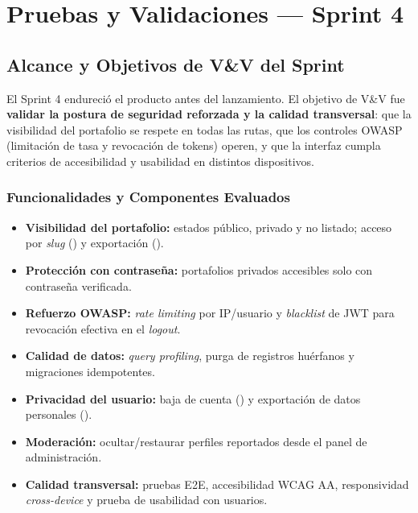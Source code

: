 \chapter{Pruebas y Validaciones — Sprint 4}
\label{ch:sprint4}

\section{Alcance y Objetivos de V\&V del Sprint}
\label{sec:s4-alcance}

El Sprint 4 endureció el producto antes del lanzamiento. El objetivo de V\&V fue
\textbf{validar la postura de seguridad reforzada y la calidad transversal}: que la
visibilidad del portafolio se respete en todas las rutas, que los controles OWASP
(limitación de tasa y revocación de tokens) operen, y que la interfaz cumpla criterios de
accesibilidad y usabilidad en distintos dispositivos.

\subsection{Funcionalidades y Componentes Evaluados}
\label{sec:s4-funcionalidades}

\begin{itemize}
    \item \textbf{Visibilidad del portafolio:} estados público, privado y no listado;
    acceso por \textit{slug} () y exportación
    ().
    \item \textbf{Protección con contraseña:} portafolios privados accesibles solo con
    contraseña verificada.
    \item \textbf{Refuerzo OWASP:} \textit{rate limiting} por IP/usuario y \textit{blacklist}
    de JWT para revocación efectiva en el \textit{logout}.
    \item \textbf{Calidad de datos:} \textit{query profiling}, purga de registros huérfanos
    y migraciones idempotentes.
    \item \textbf{Privacidad del usuario:} baja de cuenta
    () y exportación de datos personales
    ().
    \item \textbf{Moderación:} ocultar/restaurar perfiles reportados desde el panel de
    administración.
    \item \textbf{Calidad transversal:} pruebas E2E, accesibilidad WCAG AA, responsividad
    \textit{cross-device} y prueba de usabilidad con usuarios.
\end{itemize}

